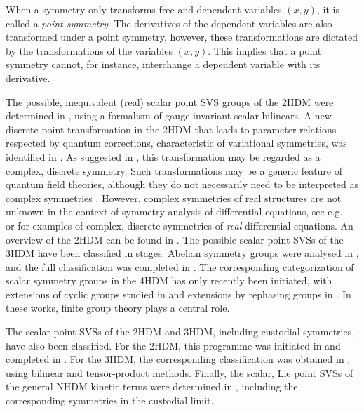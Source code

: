 \documentclass[a4paper,hidelinks, 12pt]{article}
\numberwithin{equation}{section}
\theoremstyle{plain}
\begin{document}
When a symmetry only transforms
free and dependent variables $(x,y)$, it is called a \textit{point symmetry}. The derivatives of the dependent variables are also transformed under a point symmetry, however, these transformations are dictated by the transformations of the variables $(x,y)$. This implies that a point symmetry cannot, for instance, interchange a dependent variable with its derivative.		

The possible, inequivalent (real) scalar point SVS groups of the 2HDM were determined in \cite{PhysRevD.77.015017}, using a formalism of gauge invariant scalar bilinears. 
A new discrete point transformation in the 2HDM that leads to parameter relations respected by quantum corrections, characteristic of variational symmetries, was identified in 
\cite{Ferreira:2023dke}. As suggested in \cite{Ferreira:2023dke}, this transformation may be regarded as a complex, discrete symmetry. Such transformations may be a generic feature of quantum field theories, although they do not necessarily need to be interpreted as complex symmetries \cite{Trautner:2025yxz}. However, complex symmetries of real structures are not unknown in the context of symmetry analysis of differential equations, see e.g.~\cite{hydon2000symmetry} or \cite{Gray2013AutomorphismsOL} for examples of complex, discrete symmetries of \textsl{real} differential equations.
An overview of the 2HDM can be found in \cite{Branco_2012}.    
The possible scalar point SVSs of the 3HDM have been classified in stages:
Abelian symmetry groups were analysed in \cite{Ivanov_2012}, and the full
classification was completed in \cite{Ivanov_2013}. The corresponding
categorization of scalar symmetry groups in the 4HDM has only recently been
initiated, with extensions of cyclic groups studied in \cite{Shao_2023}
and extensions by rephasing groups in \cite{Shao_2024}. In these works,
finite group theory plays a central role.

The scalar point SVSs of the 2HDM and 3HDM, including custodial symmetries,
have also been classified. For the 2HDM, this programme was initiated in
\cite{Battye:2011jj} and completed in \cite{Pilaftsis:2011ed}. For
the 3HDM, the corresponding classification was obtained in
\cite{Darvishi:2019dbh}, using bilinear and tensor-product methods. Finally, the scalar, Lie point SVSs of the general NHDM kinetic terms were determined in \cite{Olaussen:2010aq}, including the corresponding symmetries in the custodial limit.  
\end{document}
